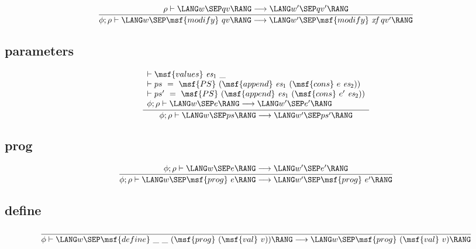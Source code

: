 \documentclass{article}
\begin{document}
\begin{gather}
  \frac{ \rho \vdash \LANG w \SEP qv \RANG \longrightarrow \LANG w'
    \SEP qv' \RANG }{ \phi; \rho \vdash \LANG w \SEP \msf{modify} \ qv
    \RANG \longrightarrow \LANG w' \SEP \msf{modify} \ \mbox{\it xf}
    \ qv' \RANG }
\end{gather}





\subsection{parameters}


\begin{gather}
\frac{\begin{array}{lll}
    \vdash \msf{values} \ \mbox{\it es}_1  \ \_ \\
%
    \vdash ps \ = \ \msf{PS} \ (\msf{append} \ \mbox{\it es}_1
    \ (\msf{cons} \ e \ \mbox{\it es}_2)) \\
%
    \vdash ps' \ = \ \msf{PS} \ (\msf{append} \ \mbox{\it es}_1
    \ (\msf{cons} \ e' \ \mbox{\it es}_2)) \\
%
    \phi; \rho
    \vdash \LANG w \SEP
    e \RANG \longrightarrow \LANG w' \SEP e' \RANG
        \end{array}}
%
  {\phi; \rho
    \vdash \LANG w \SEP
    ps \RANG \longrightarrow \LANG w' \SEP ps' \RANG }
\end{gather}



\subsection{prog}

\begin{gather}
  \frac{ \phi; \rho \vdash \LANG w \SEP e \RANG
    \longrightarrow \LANG w' \SEP e' \RANG }{ \phi; \rho \vdash
    \LANG w \SEP \msf{prog} \ e \RANG \longrightarrow \LANG
    w' \SEP \msf{prog} \ e' \RANG }
\end{gather}



\subsection{define}

\begin{gather}
  \frac{}{ \phi \vdash \LANG w \SEP \msf{define} \ \_ \ \_
    \ (\msf{prog} \ (\msf{val} \ v)) \RANG \longrightarrow \LANG w
    \SEP \msf{prog} \ (\msf{val} \ v) \RANG }
\end{gather}
\end{document}
